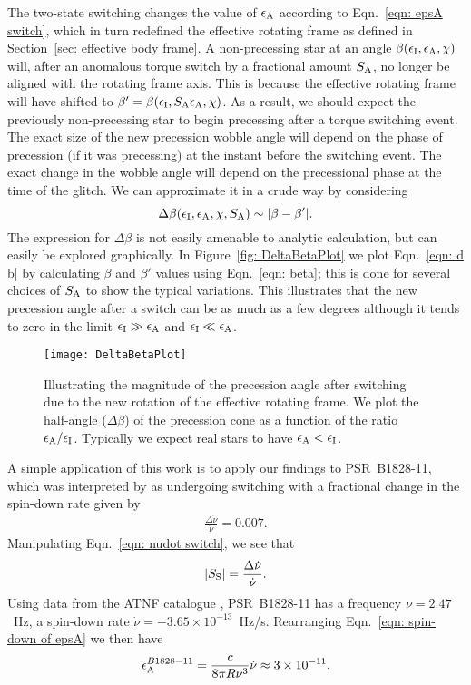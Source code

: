 \documentclass[../full_thesis/full_thesis.tex]{subfiles}
\begin{document}
The two-state switching changes the value of $\epsilon_{\mathrm{A}}$ according to
Eqn.~\eqref{eqn: epsA switch}, which in turn redefined the effective rotating frame
as defined in Section~\ref{sec: effective body frame}. A non-precessing star at an
angle $\beta(\epsilon_{\mathrm{I}}, \epsilon_{\mathrm{A}}, \chi)$ will, after an anomalous torque switch by a fractional
amount $S_{\mathrm{A}}$, no longer be aligned with the rotating frame axis. This is
because the effective rotating frame will have shifted to $\beta' = \beta(\epsilon_{\mathrm{I}},
S_{\mathrm{A}}\epsilon_{\mathrm{A}}, \chi)$. As a result, we should expect the previously
non-precessing star to begin precessing after a torque switching event.
The exact size of the new precession wobble angle will depend on the phase of
precession (if it was precessing) at the instant before the switching event.
The exact change in the wobble angle will depend on the precessional phase at
the time of the glitch. We can approximate it in a crude way by considering
\begin{equation}
    \Delta\beta(\epsilon_{\mathrm{I}}, \epsilon_{\mathrm{A}}, \chi, S_{\mathrm{A}}) \sim |\beta - \beta'|.
\label{eqn: d b}
\end{equation}
The expression for $\Delta \beta$ is not easily amenable to analytic
calculation, but can easily be explored graphically. In Figure~\ref{fig:
DeltaBetaPlot} we plot Eqn.~\eqref{eqn: d b} by calculating $\beta$ and
$\beta'$ values using Eqn.~\eqref{eqn: beta}; this is done for several choices
of $S_{\mathrm{A}}$ to show the typical variations. This illustrates that the new
precession angle after a switch can be as much as a few degrees although it
tends to zero in the limit $\epsilon_{\mathrm{I}} \gg \epsilon_{\mathrm{A}}$ and $\epsilon_{\mathrm{I}} \ll \epsilon_{\mathrm{A}}$.
\begin{figure}[htb]
    \centering
    \texttt{[image: DeltaBetaPlot]}
    \caption{Illustrating the magnitude of the precession angle after switching
        due to the new rotation of the effective rotating frame. We plot the half-angle
        ($\Delta\beta$) of the precession cone as a function of the ratio
    $\epsilon_{\mathrm{A}}/\epsilon_{\mathrm{I}}$. Typically we expect real stars to have $\epsilon_{\mathrm{A}} < \epsilon_{\mathrm{I}}$.}
    \label{fig: DeltaBetaPlot}
\end{figure}

A simple application of this work is to apply our findings to PSR~B1828-11,
which was interpreted by \citet{Lyne2010} as undergoing switching with a fractional
change in the spin-down rate given by
\begin{align}
\frac{\Delta\dot{\nu}}{\dot{\nu}} = 0.007.
\end{align}
Manipulating Eqn.~\eqref{eqn: nudot switch}, we see that
\begin{align}
|S_{\mathrm{S}}| = \frac{\Delta\dot{\nu}}{\dot{\nu}}.
\end{align}
Using data from the ATNF catalogue \citep{ATNF}, PSR~B1828-11 has a frequency
$\nu = 2.47$~Hz, a spin-down rate $\dot{\nu}=-3.65\times10^{-13}$~Hz/s.
Rearranging Eqn.~\eqref{eqn: spin-down of epsA} we then have
\begin{align}
\epsilon_{\mathrm{A}}^{B1828-11} = \frac{c}{8\pi R\nu^{3}}\dot{\nu} \approx 3 \times 10^{-11}.
\end{align}
\end{document}
